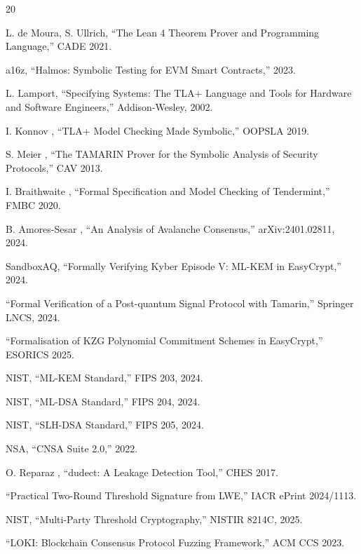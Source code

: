 \documentclass[11pt,letterpaper]{article}
\begin{document}
\begin{thebibliography}{20}

 L. de Moura, S. Ullrich, ``The Lean 4 Theorem Prover and Programming Language,'' CADE 2021.

 a16z, ``Halmos: Symbolic Testing for EVM Smart Contracts,'' 2023.

 L. Lamport, ``Specifying Systems: The TLA+ Language and Tools for Hardware and Software Engineers,'' Addison-Wesley, 2002.

 I. Konnov \etal, ``TLA+ Model Checking Made Symbolic,'' OOPSLA 2019.

 S. Meier \etal, ``The TAMARIN Prover for the Symbolic Analysis of Security Protocols,'' CAV 2013.

 I. Braithwaite \etal, ``Formal Specification and Model Checking of Tendermint,'' FMBC 2020.

 B. Amores-Sesar \etal, ``An Analysis of Avalanche Consensus,'' arXiv:2401.02811, 2024.

 SandboxAQ, ``Formally Verifying Kyber Episode V: ML-KEM in EasyCrypt,'' 2024.

 ``Formal Verification of a Post-quantum Signal Protocol with Tamarin,'' Springer LNCS, 2024.

 ``Formalisation of KZG Polynomial Commitment Schemes in EasyCrypt,'' ESORICS 2025.

 NIST, ``ML-KEM Standard,'' FIPS 203, 2024.

 NIST, ``ML-DSA Standard,'' FIPS 204, 2024.

 NIST, ``SLH-DSA Standard,'' FIPS 205, 2024.

 NSA, ``CNSA Suite 2.0,'' 2022.

 O. Reparaz \etal, ``dudect: A Leakage Detection Tool,'' CHES 2017.

 ``Practical Two-Round Threshold Signature from LWE,'' IACR ePrint 2024/1113.

 NIST, ``Multi-Party Threshold Cryptography,'' NISTIR 8214C, 2025.

 ``LOKI: Blockchain Consensus Protocol Fuzzing Framework,'' ACM CCS 2023.

\end{thebibliography}
\end{document}
